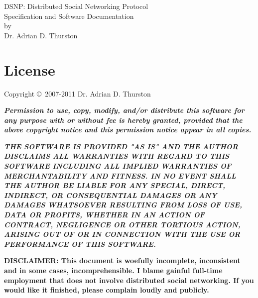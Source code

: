 \documentclass[letterpaper,11pt,oneside]{article}
\begin{document}
%
%
\thispagestyle{empty}
\begin{center}
{\huge DSNP: Distributed Social Networking Protocol}\\
\vspace*{12pt}
{\Large Specification and Software Documentation}\\
\vspace{12pt}
by\\
\vspace{12pt}
{\large Dr. Adrian D. Thurston}\\
\end{center}


\section*{License}

Copyright \copyright\ 2007-2011 Dr. Adrian D. Thurston

\vspace{5pt}

{\bf\it\noindent Permission to use, copy, modify, and/or distribute this software for any
purpose with or without fee is hereby granted, provided that the above
copyright notice and this permission notice appear in all copies.}

\vspace{5pt}

{\bf\it\noindent THE SOFTWARE IS PROVIDED "AS IS" AND THE AUTHOR DISCLAIMS ALL WARRANTIES
WITH REGARD TO THIS SOFTWARE INCLUDING ALL IMPLIED WARRANTIES OF
MERCHANTABILITY AND FITNESS. IN NO EVENT SHALL THE AUTHOR BE LIABLE FOR
ANY SPECIAL, DIRECT, INDIRECT, OR CONSEQUENTIAL DAMAGES OR ANY DAMAGES
WHATSOEVER RESULTING FROM LOSS OF USE, DATA OR PROFITS, WHETHER IN AN
ACTION OF CONTRACT, NEGLIGENCE OR OTHER TORTIOUS ACTION, ARISING OUT OF
OR IN CONNECTION WITH THE USE OR PERFORMANCE OF THIS SOFTWARE.}

\vspace{15pt}
{\noindent\bf\large DISCLAIMER: This document is woefully incomplete,
inconsistent and in some cases, incomprehensible. I blame gainful full-time
employment that does not involve distributed social networking. If you would
like it finished, please complain loudly and publicly.}

\tableofcontents

%
%


%
%
%
\end{document}
